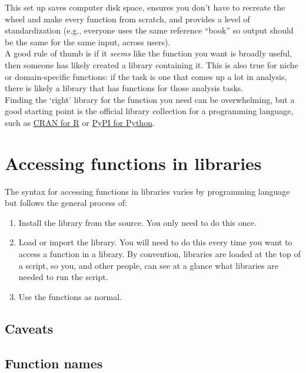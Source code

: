 \documentclass[
]{book}
\providecommand{\tightlist}{%
  \setlength{\itemsep}{0pt}\setlength{\parskip}{0pt}}
\begin{document}
This set up saves computer disk space, ensures you don't have to recreate the wheel and make every function from scratch, and provides a level of standardization (e.g., everyone uses the same reference ``book'' so output should be the same for the same input, across users).\\

A good rule of thumb is if it \emph{seems} like the function you want is broadly useful, then someone has likely created a library containing it. This is also true for niche or domain-specific functions: if the task is one that comes up a lot in analysis, there is likely a library that has functions for those analysis tasks.\\

Finding the `right' library for the function you need can be overwhelming, but a good starting point is the official library collection for a programming language, such as \href{https://cran.r-project.org/web/views/}{CRAN for R} or \href{https://pypi.org/}{PyPI for Python}.

\section{Accessing functions in libraries}\label{accessing-functions-in-libraries}

The syntax for accessing functions in libraries varies by programming language but follows the general process of:

\begin{enumerate}
\def\labelenumi{\arabic{enumi}.}
\tightlist
\item
  Install the library from the source. You only need to do this once.
\item
  Load or import the library. You will need to do this every time you want to access a function in a library. By convention, libraries are loaded at the top of a script, so you, and other people, can see at a glance what libraries are needed to run the script.
\item
  Use the functions as normal.
\end{enumerate}

\subsection{Caveats}\label{caveats-2}

\subsection{Function names}\label{function-names}
\end{document}
